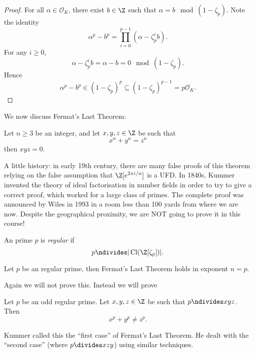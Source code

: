 \documentclass[a4paper]{article}
\renewcommand*{\O}{\mathcal{O}}
\DeclareMathOperator{\Cl}{Cl}%
\begin{document}
\begin{proof}
  For all \(\alpha \in \O_K\), there exist \(b \in \Z\) such that \(\alpha = b \mod{(1 - \zeta_p)}\). Note the identity
  \[
    \alpha^p - b^p = \prod_{i = 0}^{p - 1}(\alpha - \zeta_p^i b).
  \]
  For any \(i \geq 0\),
  \[
    \alpha - \zeta_p^i b = \alpha - b = 0 \mod{(1 - \zeta_p)}.
  \]
  Hence
  \[
    \alpha^p - b^p \in (1 - \zeta_p)^p \subseteq (1 - \zeta_p)^{p - 1} = p\O_K.
  \]
\end{proof}

We now discuss Fermat's Last Theorem:

\begin{theorem}[Wiles, 1994]
  Let \(n \geq 3\) be an integer, and let \(x, y, z \in \Z\) be such that
  \[
    x^n + y^n = z^n
  \]
  then \(xyz = 0\).
\end{theorem}

A little history: in early 19th century, there are many false proofs of this theorem relying on the false assumption that \(\Z[e^{2\pi i/n}]\) is a UFD. In 1840s, Kummer invented the theory of ideal factorisation in number fields in order to try to give a correct proof, which worked for a large class of primes. The complete proof was announced by Wiles in 1993 in a room less than 100 yards from where we are now. Despite the geographical proximity, we are NOT going to prove it in this course!

\begin{definition}
  An prime \(p\) is \emph{regular} if
  \[
    p \ndivides |\Cl(\Z[\zeta_p])|.
  \]
\end{definition}

\begin{theorem}[Kummer]
  Let \(p\) be an regular prime, then Fermat's Last Theorem holds in exponent \(n = p\).
\end{theorem}

Again we will not prove this. Instead we will prove

\begin{theorem}
  Let \(p\) be an odd regular prime. Let \(x, y, z \in \Z\) be such that \(p \ndivides xyz\). Then
  \[
    x^p + y^p \neq z^p.
  \]
\end{theorem}

Kummer called this the ``first case'' of Fermat's Last Theorem. He dealt with the ``second case'' (where \(p \divides xzy\)) using similar techniques.
\end{document}
